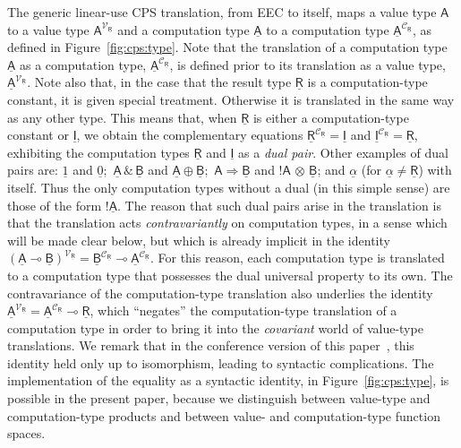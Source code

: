 \documentclass{LMCS}
\newcommand{\comptype}[1]{\underline{#1}}
\newcommand{\CconstA}{\comptype{\alpha}}
\newcommand{\VA}{\mathsf{A}}
\newcommand{\CA}{\comptype{\mathsf{A}}}
\newcommand{\CB}{\comptype{\mathsf{B}}}
\newcommand{\CR}{\comptype{\mathsf{R}}}
\newcommand{\CI}{\comptype{\mathsf{I}}}
\newcommand{\lpop}{\multimap}
\newcommand{\Cone}{\comptype{1}}
\newcommand{\Cprod}{\,\&\,}
\newcommand{\Cfun}{\Rightarrow}
\newcommand{\Cbang}[1]{{! #1}}
\newcommand{\Ccopower}[2]{! #1 \, {\otimes} \, #2}
\newcommand{\Czero}{\comptype{0}}
\newcommand{\Cplus}{\oplus}
\newcommand{\CpsVT}[1]{#1^{\mathcal{V}_{\CR}}}
\newcommand{\CpsCT}[1]{#1^{\mathcal{C}_{\CR}}}
\begin{document}
The generic linear-use  CPS translation, from  EEC 
to itself,  maps a
value type $\VA$ to a value type $\CpsVT{\VA}$ and a computation
type $\CA$ to a computation type $\CpsCT{\CA}$, as defined in
Figure~\ref{fig:cps:type}. Note that the translation of a computation type $\CA$ 
as a computation type, $\CpsCT{\CA}$, 
is defined prior to its translation as a value type, $\CpsVT{\CA}$.
Note also that, in the case that the result type $\CR$ is
a computation-type constant, it is given special treatment. Otherwise 
it is translated in the same way as any other type. This means that, when
$\CR$ is either a computation-type constant or $\CI$, we obtain the
complementary equations $\CpsCT{\CR} = \CI$ and $\CpsCT{\CI} = \CR$,
exhibiting the computation types $\CR$ and $\CI$ as a \emph{dual pair}. 
Other examples of dual pairs are:
$\Cone$ and $\Czero$; $\, \CA \Cprod \CB$ and $\CA \Cplus \CB$;
$\,\VA \Cfun \CB$ and $\Ccopower{\VA}{\CB}$; and $\CconstA$ (for 
$\CconstA \neq \CR$) with itself. Thus the
only computation types without a  dual (in this simple sense) 
are those of the form $\Cbang{\CA}$. The reason that
such dual pairs arise in the translation is that the  translation acts
\emph{contravariantly} on computation types, in a sense which will
be made clear below, but which is already implicit in the
identity $\CpsVT{(\CA \lpop \CB)} = \CpsCT{\CB} \lpop \CpsCT{\CA}$. For this reason,
each computation type is translated to a computation type that possesses the 
dual universal property to its own. The contravariance
of the computation-type translation also underlies
the identity $\CpsVT{\CA} = \CpsCT{\CA} \lpop \CR$, which ``negates'' the
computation-type translation of a computation type in order to bring it into
the \emph{covariant} world of value-type translations. 
We remark that in the conference version of this paper~\cite{EMS:fossacs}, this identity 
held only up to isomorphism, leading to syntactic
complications. The implementation of the equality as a syntactic identity, in
Figure~\ref{fig:cps:type}, is possible in the present paper, 
because we distinguish between  value-type and computation-type products and
between value- and computation-type function spaces.
\end{document}
